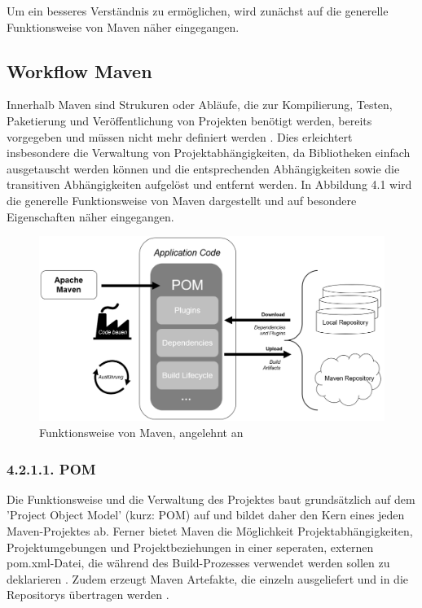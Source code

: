 Um ein besseres Verständnis zu ermöglichen, wird zunächst auf die generelle Funktionsweise von Maven näher eingegangen.

\subsection{Workflow Maven}
Innerhalb Maven sind Strukuren oder Abläufe, die zur Kompilierung, Testen, Paketierung und Veröffentlichung von Projekten benötigt werden, bereits vorgegeben und müssen nicht mehr definiert werden \cite[S. 27]{spiller_maven_2011}. Dies erleichtert insbesondere die Verwaltung von Projektabhängigkeiten, da Bibliotheken einfach ausgetauscht werden können und die entsprechenden Abhängigkeiten sowie die transitiven Abhängigkeiten aufgelöst und entfernt werden. In Abbildung 4.1 wird die generelle Funktionsweise von Maven dargestellt und auf besondere Eigenschaften näher eingegangen. 

\begin{figure}[h]
    \centering
    \includegraphics[scale=0.5]{Bilder/Workflow_Maven.png}
    \caption{Funktionsweise von Maven, angelehnt an \cite{guntur_understanding_2020}}
\end{figure}

\subsubsection{4.2.1.1. POM}
 
Die Funktionsweise und die Verwaltung des Projektes baut grundsätzlich auf dem 'Project Object Model' (kurz: POM) auf und bildet daher den Kern eines jeden Maven-Projektes ab. Ferner bietet Maven die Möglichkeit Projektabhängigkeiten, Projektumgebungen und Projektbeziehungen in einer seperaten, externen pom.xml-Datei, die während des Build-Prozesses verwendet werden sollen zu deklarieren \cite[S. 3]{varanasi_introducing_2019}\cite{the_apache_software_foundation_maven_2002}. Zudem erzeugt Maven Artefakte, die einzeln ausgeliefert und in die Repositorys übertragen werden \cite[S. 29]{spiller_maven_2011}.

